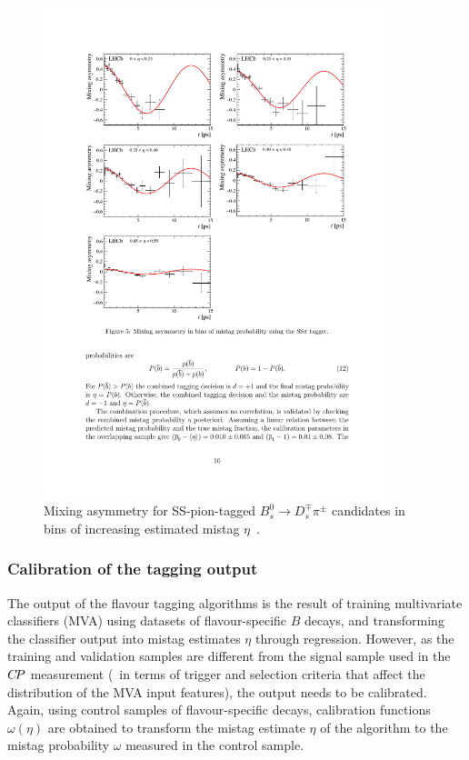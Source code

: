 \begin{figure}[t]
	\begin{center}
		\includegraphics[width=0.9\textwidth]{04Flavourtagging/figs/Dilution.pdf}
	\end{center}
        \vspace{-2mm}
	\caption{Mixing asymmetry for SS-pion-tagged $B^0_s\to D^{\mp}_s\pi^{\pm}$ candidates in bins of increasing estimated mistag $\eta$~\cite{LHCb-PAPER-2016-039}.}
	\label{fig:dilution}
\end{figure}


\subsubsection{Calibration of the tagging output}
\label{sec:tagging:calibration}

The output of the flavour tagging algorithms is the result of training
multivariate classifiers (MVA) using datasets of flavour-specific $B$ decays, and
transforming the classifier output into mistag estimates $\eta$ through
regression. However, as the training and validation samples are different
from the signal sample used in the $C\!P$ measurement (\eg~in terms of trigger
and selection criteria that affect the distribution of the MVA input features),
the output needs to be calibrated. Again, using control samples of flavour-specific decays, 
calibration functions $\omega(\eta)$ are obtained to
transform the mistag estimate $\eta$ of the algorithm to the mistag probability
$\omega$ measured in the control sample.

